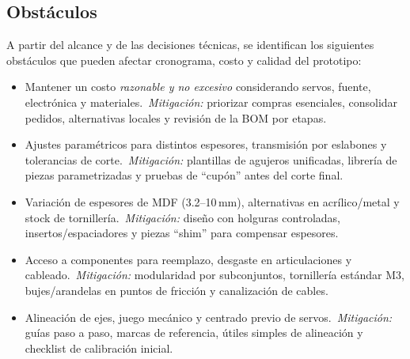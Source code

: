 \subsection{Obstáculos}
A partir del alcance y de las decisiones técnicas, se identifican los siguientes obstáculos que pueden afectar cronograma, costo y calidad del prototipo:

\begin{itemize}
  \item Mantener un costo \emph{razonable y no excesivo} considerando servos, fuente, electrónica y materiales.\ \emph{Mitigación:} priorizar compras esenciales, consolidar pedidos, alternativas locales y revisión de la BOM por etapas.
  
  \item Ajustes paramétricos para distintos espesores, transmisión por eslabones y tolerancias de corte.\ \emph{Mitigación:} plantillas de agujeros unificadas, librería de piezas parametrizadas y pruebas de “cupón” antes del corte final.
  
  
  \item Variación de espesores de MDF (3.2--10\,mm), alternativas en acrílico/metal y stock de tornillería.\ \emph{Mitigación:} diseño con holguras controladas, insertos/espaciadores y piezas “shim” para compensar espesores.
  
  \item Acceso a componentes para reemplazo, desgaste en articulaciones y cableado.\ \emph{Mitigación:} modularidad por subconjuntos, tornillería estándar M3, bujes/arandelas en puntos de fricción y canalización de cables.
  
  \item Alineación de ejes, juego mecánico y centrado previo de servos.\ \emph{Mitigación:} guías paso a paso, marcas de referencia, útiles simples de alineación y checklist de calibración inicial.
\end{itemize}



